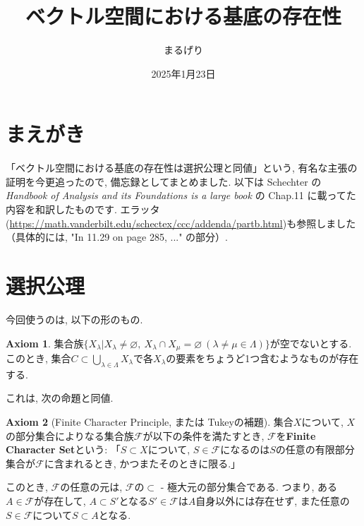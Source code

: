 \documentclass[a4paper]{ujarticle}
\title{ベクトル空間における基底の存在性}
\numberwithin{equation}{section}
\theoremstyle{definition}
\newtheorem{axiom}{Axiom}
\begin{document}
\date{2025年1月23日}
\author{まるげり}

\maketitle
\setcounter{section}{-1}
\section{まえがき}
    「ベクトル空間における基底の存在性は選択公理と同値」という, 
    有名な主張の証明を今更追ったので, 備忘録としてまとめました.
    以下は Schechter の \textit{Handbook of Analysis and its Foundations is a large book} \cite{Schechter99} の
    Chap.11 に載ってた内容を和訳したものです. 
    エラッタ(\url{https://math.vanderbilt.edu/schectex/ccc/addenda/partb.html})も参照しました
    （具体的には, "In 11.29 on page 285, ..." の部分）.

\section{選択公理 \cite[Chap.6]{Schechter99}}

    今回使うのは, 以下の形のもの.

    \begin{axiom} \label{AC2}
        集合族$\{X_{\lambda} | X_{\lambda} \neq \varnothing, \ X_{\lambda} \cap X_{\mu} = \varnothing \ (\lambda \neq \mu \in \Lambda)\}$が空でないとする.
        このとき, 集合$C \subset \bigcup_{\lambda \in \Lambda} X_{\lambda}$で各$X_{\lambda}$の要素をちょうど1つ含むようなものが存在する.
    \end{axiom}

    これは, 次の命題と同値.

    \begin{axiom}[Finite Character Principle, または Tukeyの補題] \label{AC5}
        集合$X$について, $X$の部分集合によりなる集合族$\mathcal{F}$が以下の条件を満たすとき, 
        $\mathcal{F}$を\textbf{Finite Character Set}という:
        「$S \subset X$について, $S \in \mathcal{F}$になるのは$S$の任意の有限部分集合が$\mathcal{F}$に含まれるとき, 
        かつまたそのときに限る.」

        このとき, $\mathcal{F}$の任意の元は, $\mathcal{F}$の$\subset$ - 極大元の部分集合である.
        つまり, ある$A \in \mathcal{F}$が存在して, $A \subset S'$となる$S' \in \mathcal{F}$は$A$自身以外には存在せず, 
        また任意の$S \in \mathcal{F}$について$S \subset A$となる.
    \end{axiom}
\end{document}
